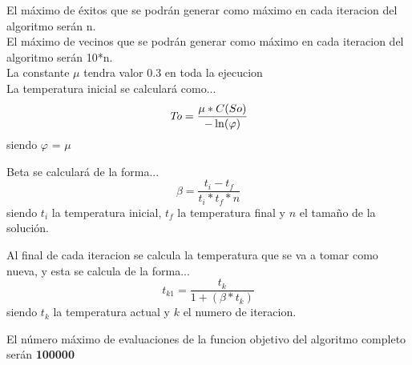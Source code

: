 \documentclass{article}
\begin{document}
El máximo de éxitos que se podrán generar como máximo en cada iteracion del algoritmo serán n.\\
El máximo de vecinos que se podrán generar como máximo en cada iteracion del algoritmo serán 10*n.\\
La constante $\mu$ tendra valor 0.3 en toda la ejecucion \\
La temperatura inicial se calculará como...
\begin{equation}
	\emph{To} = \frac{ \mu * C(So)  }{ - \ln( \varphi  )   }
\end{equation}
\newline siendo $\varphi$ = $\mu$

\vspace {5mm}
Beta se calculará de la forma...
\begin{equation}
	\beta = \frac{ t_i - t_f }{ t_i * t_f * n  }
\end{equation}
\newline siendo $t_i$ la temperatura inicial, $t_f$ la temperatura final y $n$ el tamaño de la solución.
\vspace {5mm}

Al final de cada iteracion se calcula la temperatura que se va a tomar como nueva, y esta
se calcula de la forma...
\begin{equation}
	t_{k1} = \frac{ t_k }{ 1 + (\beta * t_k) }
\end{equation}
\newline siendo $t_k$ la temperatura actual y $k$ el numero de iteracion.

El número máximo de evaluaciones de la funcion objetivo del algoritmo completo serán \textbf{100000}
\end{document}
